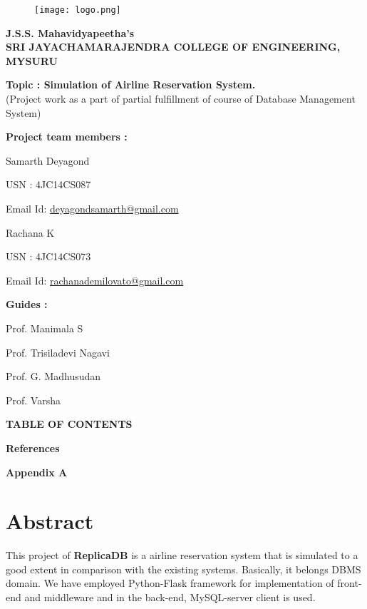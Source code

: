 \documentclass[hidelinks=true]{article}
\begin{document}
\begin{center}
\begin{figure}[h]
\hfill\texttt{[image: logo.png]}\hspace*{\fill}
\end{figure}
\Large{\textbf{J.S.S. Mahavidyapeetha's}}\\
\LARGE{\textbf{SRI JAYACHAMARAJENDRA COLLEGE OF ENGINEERING, MYSURU}}

\vspace{50pt}
\textbf{Topic : Simulation of Airline Reservation System.}\\ \normalsize (Project work as a part of partial fulfillment of course of Database Management System)
\end{center}

\vspace{40pt}

\large
\textbf{Project team members :}

Samarth Deyagond 
\vspace*{-5pt}

USN : 4JC14CS087
\vspace*{-5pt}

Email Id: \href{deyagondsamarth@gmail.com}{deyagondsamarth@gmail.com}

Rachana K
\vspace*{-5pt}

USN : 4JC14CS073
\vspace*{-5pt}

Email Id: \href{rachanademilovato@gmail.com}{rachanademilovato@gmail.com}
\vspace{30pt}

\large
\textbf{Guides :}

Prof. Manimala S

Prof. Trisiladevi Nagavi

Prof. G. Madhusudan

Prof. Varsha
\pagebreak

\begin{center}
\LARGE{{\textbf{TABLE OF CONTENTS}}}
\end{center}
\hypersetup{hidelinks}
\tableofcontents

\Large{\textbf{References}}

\Large{\textbf{Appendix A}}

\pagebreak


\section{Abstract}
\large    
This project of \textbf{ReplicaDB} is a airline reservation system that is simulated to a good extent in comparison with the existing systems. Basically, it belongs DBMS domain. We have employed Python-Flask framework for implementation of front-end and middleware and in the back-end, MySQL-server client is used.
\end{document}

